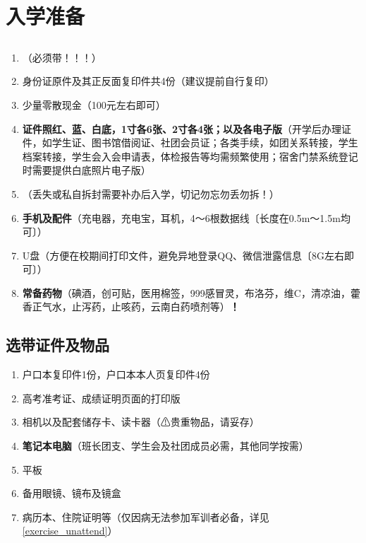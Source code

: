 \section[入学准备]{入学准备}

\subsection[必要证件及物品]{}
\begin{enumerate}
      \item \textbf{}（必须带！！！）
      \item 身份证原件及其正反面复印件共4份（建议提前自行复印）
      \item 少量零散现金（100元左右即可）\footnotemark
      \item \textbf{证件照红、蓝、白底，1寸各6张、2寸各4张；以及各电子版}（开学后办理证件，如学生证、图书馆借阅证、社团会员证；各类手续，如团关系转接，学生档案转接，学生会入会申请表，体检报告等均需频繁使用；宿舍门禁系统登记时需要提供白底照片电子版）
      \item \textbf{}（丢失或私自拆封需要补办后入学，切记勿忘勿丢勿拆！）
      \item \textbf{手机及配件}（充电器，充电宝，耳机，4～6根数据线〔长度在0.5m～1.5m均可〕）
      \item U盘（方便在校期间打印文件，避免异地登录QQ、微信泄露信息〔8G左右即可〕）
      \item \textbf{常备药物}（碘酒，创可贴，医用棉签，999感冒灵，布洛芬，维C，清凉油，藿香正气水，止泻药，止咳药，云南白药喷剂等）\textbf{！}
\end{enumerate}

\subsection[选带证件及物品]{选带证件及物品}
\begin{enumerate}
      \item 户口本复印件1份，户口本本人页复印件4份\footnotemark
      \item 高考准考证、成绩证明页面的打印版\footnotemark
      \item 相机以及配套储存卡、读卡器（⚠贵重物品，请妥存）
      \item \textbf{笔记本电脑}（班长团支、学生会及社团成员必需，其他同学按需）
      \item 平板\footnotemark
      \item 备用眼镜、镜布及镜盒
      \item 病历本、住院证明等（仅因病无法参加军训者必备，详见\uline{\ref{exercise_unattend}}）
\end{enumerate}

